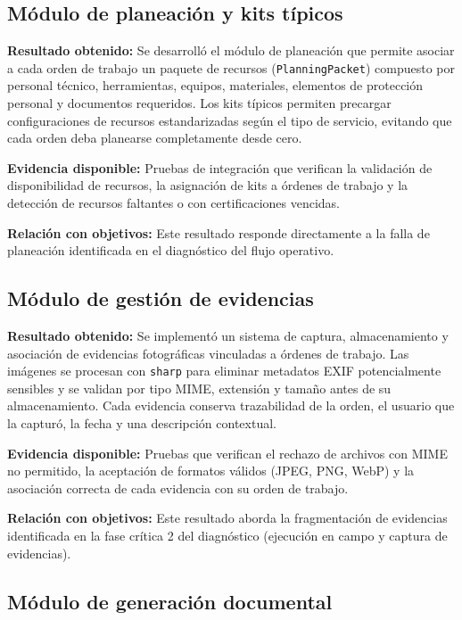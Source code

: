 \subsection{Módulo de planeación y kits típicos}

\textbf{Resultado obtenido:} Se desarrolló el módulo de planeación que permite asociar a cada orden de trabajo un paquete de recursos (\texttt{PlanningPacket}) compuesto por personal técnico, herramientas, equipos, materiales, elementos de protección personal y documentos requeridos. Los kits típicos permiten precargar configuraciones de recursos estandarizadas según el tipo de servicio, evitando que cada orden deba planearse completamente desde cero.

\textbf{Evidencia disponible:} Pruebas de integración que verifican la validación de disponibilidad de recursos, la asignación de kits a órdenes de trabajo y la detección de recursos faltantes o con certificaciones vencidas.

\textbf{Relación con objetivos:} Este resultado responde directamente a la falla de planeación identificada en el diagnóstico del flujo operativo.

\subsection{Módulo de gestión de evidencias}

\textbf{Resultado obtenido:} Se implementó un sistema de captura, almacenamiento y asociación de evidencias fotográficas vinculadas a órdenes de trabajo. Las imágenes se procesan con \texttt{sharp} para eliminar metadatos EXIF potencialmente sensibles y se validan por tipo MIME, extensión y tamaño antes de su almacenamiento. Cada evidencia conserva trazabilidad de la orden, el usuario que la capturó, la fecha y una descripción contextual.

\textbf{Evidencia disponible:} Pruebas que verifican el rechazo de archivos con MIME no permitido, la aceptación de formatos válidos (JPEG, PNG, WebP) y la asociación correcta de cada evidencia con su orden de trabajo.

\textbf{Relación con objetivos:} Este resultado aborda la fragmentación de evidencias identificada en la fase crítica 2 del diagnóstico (ejecución en campo y captura de evidencias).

\subsection{Módulo de generación documental}

